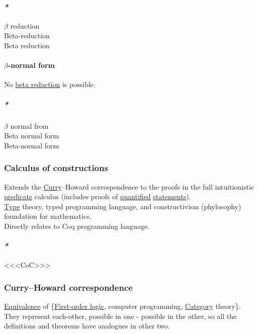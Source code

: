\documentclass[11pt]{article}
\begin{document}
\paragraph{\emph{*}}
\label{sec:org35edda6}

\label{orgbcb4af3}\(\beta\) reduction\\
\label{orgeb925c3}Beta-reduction\\
\label{org3321bb3}Beta reduction\\

\paragraph{\label{org2ba845c}\(\beta\)-normal form}
\label{sec:org9543599}
No \hyperref[org3321bb3]{beta reduction} is possible.\\

\subparagraph{\emph{*}}
\label{sec:org1a963ac}

\label{orgff0cef0}\(\beta\) normal from\\
\label{org34ad336}Beta normal form\\
\label{org3480f09}Beta-normal form\\

\subsubsection{\label{org3cedf32}Calculus of constructions}
\label{sec:org5ae16b1}
Extends the \hyperref[orgea8bb21]{Curry}–Howard correspondence to the proofs in the full intuitionistic \hyperref[orgec7f705]{predicate} calculus (includes proofs of \hyperref[org818c50e]{quantified} \hyperref[org0c99cef]{statements}).\\
\hyperref[orgc4aea2f]{Type} theory, typed programming language, and constructivism (phylosophy) foundation for mathematics.\\
Directly relates to Coq programming language.\\

\paragraph{\emph{*}}
\label{sec:org0848b73}

<<<\label{orgc0ab67f}CoC>>>\\

\subsubsection{\label{org510372e}Curry–Howard correspondence}
\label{sec:org7ee3dd2}
\hyperref[orgbc0d2cd]{Equivalence} of \{\hyperref[orgbfdb58a]{First-order logic}, computer programming, \hyperref[org0450535]{Category} theory\}. They represent each-other, possible in one - possible in the other, so all the definitions and theorems have analogues in other two.\\
\end{document}
